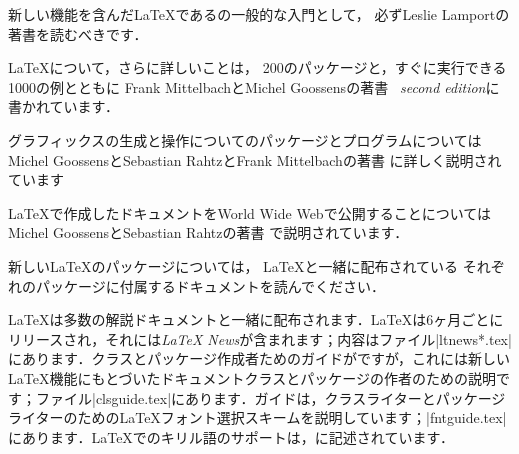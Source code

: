 \documentclass{ltxguide}[2001/05/28]
\begin{document}
新しい機能を含んだ\LaTeX{}である\LaTeXe{}の一般的な入門として，
必ずLeslie Lamport\cite{A-W:LLa94}の著書\emph{\LaTeXbook}を読むべきです．

\LaTeX{}について，さらに詳しいことは，
200のパッケージと，すぐに実行できる
1000の例とともに
Frank MittelbachとMichel Goossens\cite{A-W:MG2004}の著書
\emph{\LaTeXcomp\ second edition}に書かれています．

グラフィックスの生成と操作についてのパッケージとプログラムについては
Michel GoossensとSebastian RahtzとFrank Mittelbachの著書\cite{A-W:GRM97}\emph{\LaTeXGcomp}
に詳しく説明されています

\LaTeX{}で作成したドキュメントをWorld Wide Webで公開することについては
Michel GoossensとSebastian Rahtz\cite{A-W:GR99}の著書
\emph{\LaTeXWcomp}で説明されています．

新しい\LaTeX{}のパッケージについては，
\LaTeX{}と一緒に配布されている
それぞれのパッケージに付属するドキュメントを読んでください．

\LaTeX{}は多数の解説ドキュメントと一緒に配布されます．\LaTeX{}は6ヶ月ごとにリリースされ，それには\emph{\LaTeX{} News}が含まれます；内容はファイル|ltnews*.tex|にあります．クラスとパッケージ作成者ためのガイドが\emph{\clsguide}ですが，これには新しい\LaTeX{}機能にもとづいたドキュメントクラスとパッケージの作者のための説明です；ファイル|clsguide.tex|にあります．ガイド\emph{\fntguide}は，クラスライターとパッケージライターのための\LaTeX{}フォント選択スキームを説明しています；|fntguide.tex|にあります．\LaTeX{}でのキリル語のサポートは，\emph{\cyrguide}に記述されています．
\end{document}
